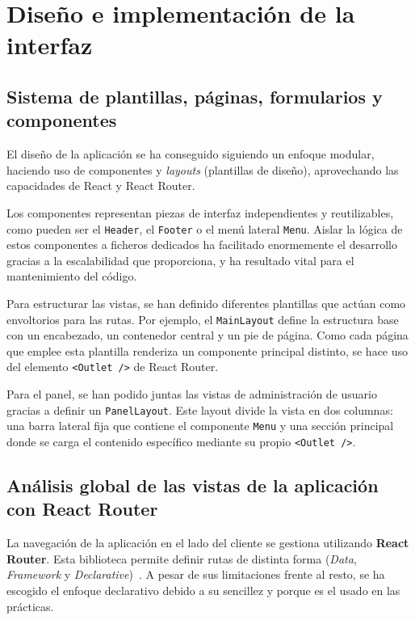 \documentclass[11pt]{article}
\begin{document}
      \clearpage

\section{Diseño e implementación de la interfaz}

  \subsection{Sistema de plantillas, páginas, formularios y componentes}

      El diseño de la aplicación se ha conseguido siguiendo un enfoque modular,
      haciendo uso de componentes y \textit{layouts} (plantillas de diseño),
      aprovechando las capacidades de React y React Router.

      Los componentes representan piezas de interfaz independientes y reutilizables,
      como pueden ser el \texttt{Header}, el \texttt{Footer} o el menú lateral
      \texttt{Menu}. Aislar la lógica de estos componentes a ficheros dedicados ha
      facilitado enormemente el desarrollo gracias a la escalabilidad que
      proporciona, y ha resultado vital para el mantenimiento del código.

      Para estructurar las vistas, se han definido diferentes plantillas que actúan
      como envoltorios para las rutas. Por ejemplo, el \texttt{MainLayout} define la
      estructura base con un encabezado, un contenedor central y un pie de página.
      Como cada página que emplee esta plantilla renderiza un componente principal
      distinto, se hace uso del elemento \texttt{<Outlet />} de React Router.

      Para el panel, se han podido juntas las vistas de administración de usuario
      gracias a definir un \texttt{PanelLayout}. Este layout divide la vista en dos
      columnas: una barra lateral fija que contiene el componente \texttt{Menu} y una
      sección principal donde se carga el contenido específico mediante su propio
      \texttt{<Outlet />}.

  \subsection{Análisis global de las vistas de la aplicación con React Router}

      La navegación de la aplicación en el lado del cliente se gestiona utilizando
      \textbf{React Router}. Esta biblioteca permite definir rutas de distinta forma
      (\textit{Data}, \textit{Framework} y
      \textit{Declarative})~\cite{react_router_start_routing}. A pesar de sus
      limitaciones frente al resto, se ha escogido el enfoque declarativo debido a su
      sencillez y porque es el usado en las prácticas.
\end{document}
